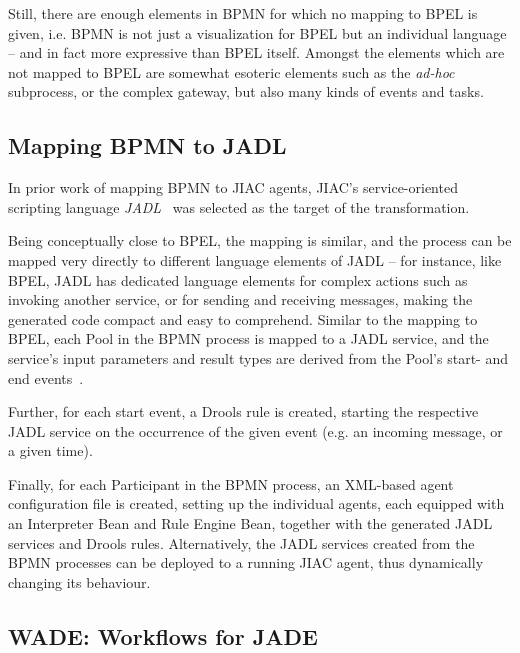 Still, there are enough elements in BPMN for which no mapping to BPEL is given,
i.e. BPMN is not just a visualization for BPEL but an individual language -- and
in fact more expressive than BPEL itself.  Amongst the elements which are not
mapped to BPEL are somewhat esoteric elements such as the \emph{ad-hoc} subprocess,
or the complex gateway, but also many kinds of events and tasks.



\subsection{Mapping BPMN to JADL}

In prior work of mapping BPMN to JIAC agents, JIAC's service-oriented scripting
language \emph{JADL}~\cite{hirsch2010programming} was selected as the target of
the transformation.

Being conceptually close to BPEL, the mapping is similar, and the process can be
mapped very directly to different language elements of JADL -- for instance, like
BPEL, JADL has dedicated language elements for complex actions such as invoking
another service, or for sending and receiving messages, making the generated code
compact and easy to comprehend.  Similar to the mapping to BPEL, each Pool in the
BPMN process is mapped to a JADL service, and the service's input parameters and
result types are derived from the Pool's start- and end
events~\cite{kuester2010integrating}.

Further, for each start event, a Drools rule is created, starting the respective
JADL service on the occurrence of the given event (e.g. an incoming message, or
a given time).

Finally, for each Participant in the BPMN process, an XML-based agent configuration
file is created, setting up the individual agents, each equipped with an Interpreter
Bean and Rule Engine Bean, together with the generated JADL services and Drools
rules.  Alternatively, the JADL services created from the BPMN processes can be
deployed to a running JIAC agent, thus dynamically changing its behaviour.



\subsection{WADE: Workflows for JADE}

